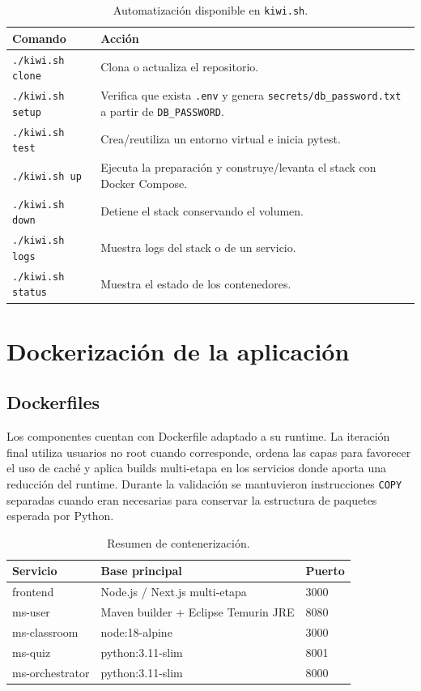 \documentclass[12pt,a4paper]{article}
\begin{document}
\begin{table}[H]
\centering
\begin{tabular}{p{4cm}p{9.5cm}}
\toprule
\textbf{Comando} & \textbf{Acción}\\
\midrule
\texttt{./kiwi.sh clone} & Clona o actualiza el repositorio.\\
\texttt{./kiwi.sh setup} & Verifica que exista \texttt{.env} y genera \texttt{secrets/db\_password.txt} a partir de \texttt{DB\_PASSWORD}.\\
\texttt{./kiwi.sh test} & Crea/reutiliza un entorno virtual e inicia pytest.\\
\texttt{./kiwi.sh up} & Ejecuta la preparación y construye/levanta el stack con Docker Compose.\\
\texttt{./kiwi.sh down} & Detiene el stack conservando el volumen.\\
\texttt{./kiwi.sh logs} & Muestra logs del stack o de un servicio.\\
\texttt{./kiwi.sh status} & Muestra el estado de los contenedores.\\
\bottomrule
\end{tabular}
\caption{Automatización disponible en \texttt{kiwi.sh}.}
\end{table}


\section{Dockerización de la aplicación}
\subsection{Dockerfiles}
Los componentes cuentan con Dockerfile adaptado a su runtime. La iteración final utiliza usuarios no root cuando corresponde, ordena las capas para favorecer el uso de caché y aplica builds multi-etapa en los servicios donde aporta una reducción del runtime. Durante la validación se mantuvieron instrucciones \texttt{COPY} separadas cuando eran necesarias para conservar la estructura de paquetes esperada por Python.

\begin{table}[H]
\centering
\begin{tabular}{p{3.5cm}p{6.5cm}p{2cm}}
\toprule
\textbf{Servicio} & \textbf{Base principal} & \textbf{Puerto}\\
\midrule
frontend & Node.js / Next.js multi-etapa & 3000\\
ms-user & Maven builder + Eclipse Temurin JRE & 8080\\
ms-classroom & node:18-alpine & 3000\\
ms-quiz & python:3.11-slim & 8001\\
ms-orchestrator & python:3.11-slim & 8000\\
\bottomrule
\end{tabular}
\caption{Resumen de contenerización.}
\end{table}
\end{document}
